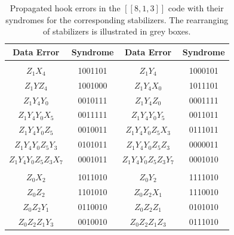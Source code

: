 \documentclass[reprint, amsmath,amssymb, aps,pra,
 floatfix,
]{revtex4-2}
\newcommand{\PadCell}[1]{\kern8pt#1\kern8pt}
\newcommand{\PadCellColor}[2]{\cellcolor{#1}\kern8pt#2\kern8pt}
\begin{document}
\begin{table}[h]
\centering
\scriptsize
  \setlength{\tabcolsep}{0pt} %
  \renewcommand{\arraystretch}{1.2} %

  \begin{tabular}{|c|c|c|c|}
    \hline
    \textbf{ Data Error } & \textbf{ Syndrome } & \textbf{ Data Error } & \textbf{ Syndrome } \\ \hline

  
    \rowcolor{gray!20}
    \multicolumn{4}{|c|}{\boldmath\textbf{$Y_0 Z_1 Z_3 Y_4 Z_5 Z_6 Z_7$} $\longrightarrow$ $Z_1Y_4Y_0Z_5Z_3 Z_7Z_6$} \\ \hline

    $Z_1X_4$  & 1001101  & $Z_1Y_4$    &  1000101      \\ \hline
    $Z_1YZ_4$  & 1001000  & $Z_1Y_4X_0$   &  1011101      \\ \hline
    $Z_1Y_4Y_0$  & 0010111  & $Z_1Y_4Z_0$    & 0001111      \\ \hline
    $Z_1Y_4Y_0X_5$  & 0011111  & $Z_1Y_4Y_0Y_5$    &  0011011      \\ \hline
    $Z_1Y_4Y_0Z_5$  & 0010011  & $Z_1Y_4Y_0Z_5X_3$    & 0111011      \\ \hline
    $Z_1Y_4Y_0Z_5Y_3$    &  0101011   & $Z_1Y_4Y_0Z_5Z_3$    &  0000011      \\ \hline
     $Z_1Y_4Y_0Z_5Z_3X_7$    &  0001011   & $Z_1Y_4Y_0Z_5Z_3Y_7$    &  0001010      \\ \hline

   



    
\rowcolor{gray!20}
    \multicolumn{4}{|c|}{\boldmath\textbf{$Z_0Z_1 Z_2 X_3Z_6$} $\longrightarrow$ $Z_0Z_2Z_1X_3Z_6$} \\ \hline

   $Z_0X_2$  & 1011010  & $Z_0Y_2$    &  1111010      \\ \hline
   $Z_0Z_2$  & 1101010  & $Z_0Z_2X_1$    &  1110010      \\ \hline
   $Z_0Z_2Y_1$  & 0110010  & $Z_0Z_2Z_1$    &  0101010      \\ \hline
   $Z_0Z_2Z_1Y_3$  & 0010010  & $Z_0Z_2Z_1Z_3$    &  0111010      \\ \hline

  \end{tabular}

\caption{Propagated hook errors in the $[[8,1,3]]$ code with their syndromes for the corresponding stabilizers.
The rearranging of stabilizers is illustrated in grey boxes. 
}
\label{tab:errors_due_to_faults_8_1}
\end{table}
\end{document}
